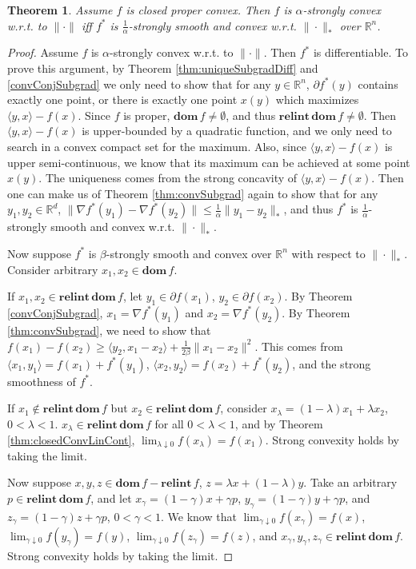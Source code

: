 \documentclass[openany]{book}
\newtheorem{theorem}{Theorem}[chapter]
\theoremstyle{definition}
\theoremstyle{remark}
\begin{document}
\begin{theorem}
    Assume $f$ is closed proper convex. Then $f$ is $\alpha$-strongly convex w.r.t. to $\|\cdot\|$ iff $f^*$ is $\frac{1}{\alpha}$-strongly smooth and convex w.r.t. $\|\cdot\|_*$ over $\mathbb{R}^n$.
\end{theorem}
\begin{proof}
    Assume $f$ is $\alpha$-strongly convex w.r.t. to $\|\cdot\|$. Then $f^*$ is differentiable. To prove this argument, by Theorem \ref{thm:uniqueSubgradDiff} and \ref{convConjSubgrad} we only need to show that for any $y\in \mathbb{R}^n$, $\partial f^*(y)$ contains exactly one point, or there is exactly one point $x(y)$ which maximizes $\langle y,x\rangle-f(x)$. Since $f$ is proper, $\mathbf{dom}\,f\ne\emptyset$, and thus $\mathbf{relint}\,\mathbf{dom}\,f\ne\emptyset$. Then $\langle y,x\rangle-f(x)$ is upper-bounded by a quadratic function, and we only need to search in a convex compact set for the maximum. Also, since $\langle y,x\rangle-f(x)$ is upper semi-continuous, we know that its maximum can be achieved at some point $x(y)$. The uniqueness comes from the strong concavity of $\langle y,x\rangle-f(x)$. Then one can make us of Theorem \ref{thm:convSubgrad} again to show that for any $y_1,y_2\in \mathbb{R}^d$, $\|\nabla f^*(y_1)-\nabla f^*(y_2)\|\le \frac{1}{\alpha}\|y_1-y_2\|_*$, and thus $f^*$ is $\frac{1}{\alpha}$-strongly smooth and convex w.r.t. $\|\cdot\|_*$.

    Now suppose $f^*$ is $\beta$-strongly smooth and convex over $\mathbb{R}^n$ with respect to $\|\cdot\|_*$. Consider arbitrary $x_1,x_2\in \mathbf{dom}\,f$.

    If $x_1,x_2\in \mathbf{relint}\,\mathbf{dom}\,f$, let $y_1\in\partial f(x_1)$, $y_2\in\partial f(x_2)$. By Theorem \ref{convConjSubgrad}, $x_1=\nabla f^*(y_1)$ and $x_2=\nabla f^*(y_2)$. By Theorem \ref{thm:convSubgrad}, we need to show that $f(x_1)-f(x_2)\ge \langle y_2,x_1-x_2\rangle+\frac{1}{2\beta}\|x_1-x_2\|^2$. This comes from $\langle x_1,y_1\rangle=f(x_1)+f^*(y_1)$, $\langle x_2,y_2\rangle=f(x_2)+f^*(y_2)$, and the strong smoothness of $f^*$.

    If $x_1\not\in \mathbf{relint}\,\mathbf{dom}\,f$ but $x_2\in \mathbf{relint}\,\mathbf{dom}\,f$, consider $x_{\lambda}=(1-\lambda)x_1+\lambda x_2$, $0<\lambda<1$. $x_{\lambda}\in \mathbf{relint}\,\mathbf{dom}\,f$ for all $0<\lambda<1$, and by Theorem \ref{thm:closedConvLinCont}, $\lim_{\lambda\downarrow0}f(x_{\lambda})=f(x_1)$. Strong convexity holds by taking the limit.

    Now suppose $x,y,z\in \mathbf{dom}\,f-\mathbf{relint}\,f$, $z=\lambda x+(1-\lambda)y$. Take an arbitrary $p\in\mathbf{relint}\,\mathbf{dom }\,f$, and let $x_{\gamma}=(1-\gamma)x+\gamma p$, $y_{\gamma}=(1-\gamma)y+\gamma p$, and $z_{\gamma}=(1-\gamma)z+\gamma p$, $0<\gamma<1$. We know that $\lim_{\gamma\downarrow0}f(x_{\gamma})=f(x)$, $\lim_{\gamma\downarrow0}f(y_{\gamma})=f(y)$, $\lim_{\gamma\downarrow0}f(z_{\gamma})=f(z)$, and $x_{\gamma},y_{\gamma},z_{\gamma}\in \mathbf{relint}\,\mathbf{dom}\,f$. Strong convexity holds by taking the limit.
\end{proof}
\end{document}
